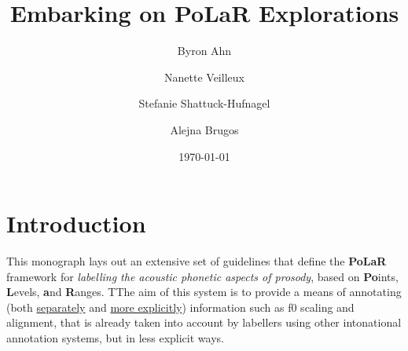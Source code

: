 \documentclass[11pt, twoside]{memoir}
\def\THIStitle{Embarking on PoLaR Explorations}
\def\THISsubtitle{A Framework for Intonational Annotation and Analysis}
\begin{document}
\frontmatter
{}

\title{\THIStitle}
\author{Byron Ahn \and Nanette Veilleux \and Stefanie Shattuck-Hufnagel \and Alejna Brugos}
\date{\today}


\tableofcontents
\newpage
\listoffigures
\listoftables
\newpage

\mainmatter

\section*{Introduction}\label{sec:introduction}

\setcounter{footnote}{0}
\renewcommand*{\thefootnote}{\fnsymbol{footnote}}

This monograph lays out an extensive set of guidelines that define the \textbf{PoLaR} framework for \textit{labelling the acoustic phonetic aspects of prosody}, based on \textbf{Po}ints, \textbf{L}evels, \textbf{a}nd \textbf{R}anges.  TThe aim of this system is to provide a means of annotating (both \uline{separately} and \uline{more explicitly}) information such as f0 scaling and alignment, that is already taken into account by labellers using other intonational annotation systems, but in less explicit ways.
\end{document}
